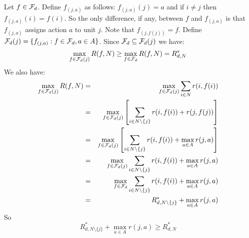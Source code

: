 \documentclass{article}
\begin{document}

Let $f \in {\cal F}_d$. Define $f_{(j,a)}$ as follows:
$f_{(j,a)}(j) = a$ and if $i\neq j$ then
$f_{(j,a)}(i) = f(i)$. So the only difference, if any, between $f$ and
$f_{(j,a)}$ is that $f_{(j,a)}$ assigns action $a$ to unit $j$.
Note that $f_{(j,f(j))} = f$.
Define ${\cal F}_d(j) = \{f_{(j,a)}: f \in {\cal
  F}_{d}, a \in A\}$. Since  ${\cal F}_d \subseteq {\cal F}_d(j)$
we have:
 \begin{equation}
   \label{eq:addfun}
  \max_{f \in {\cal F}_d(j)} R(f,N) \geq \max_{f \in {\cal F}_d}
  R(f,N) = R^{*}_{d,N}
\end{equation}
We also have:
\begin{eqnarray}
  \label{eq:addfun2}
  \max_{f \in {\cal F}_d(j)} R(f,N)
  & =
  &\max_{f \in {\cal F}_d(j)} \sum_{i \in N} r(i,f(i)) \\
  & =
  & \max_{f \in {\cal F}_d(j)} \left[   \sum_{i \in N \setminus
    \{j\} } r(i,f(i)) + r(j,f(j)) \right] \\
  & =
  & \max_{f \in {\cal F}_d(j)} \left[   \sum_{i \in N \setminus
    \{j\} } r(i,f(i)) + \max_{a
    \in A} r(j,a) \right] \\
  & = 
  & \max_{f \in
  {\cal F}_d(j)} \sum_{i \in N \setminus \{j\}} r(i,f(i)) +  \max_{a
    \in A} r(j,a) \\
  & = 
  & \max_{f \in
  {\cal F}_d} \sum_{i \in N \setminus \{j\}} r(i,f(i)) +  \max_{a
    \in A} r(j,a) \\
  & =
  & R^{*}_{d,N \setminus \{j\}} +  \max_{a
    \in A} r(j,a) 
\end{eqnarray}
So
\begin{equation}
  \label{eq:maineq}
  R^{*}_{d,N \setminus \{j\}} 
  +  \max_{a
    \in A} r(j,a) \geq   R^{*}_{d,N } 
\end{equation}
\end{document}
